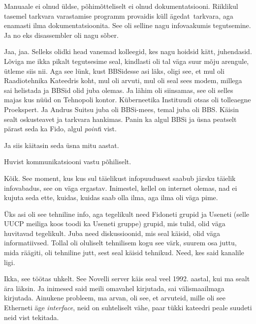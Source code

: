 Manuaale ei olnud üldse, põhimõtteliselt ei olnud dokumentatsiooni. Riiklikul 
tasemel tarkvara varastamise programm provaidis küll ägedat tarkvara, aga 
enamasti ilma dokumentatsioonita. See oli selline nagu  infovaakumis 
tegutsemine. Ja no eks disassembler oli nagu sõber.


Jaa, jaa. Selleks olidki head vanemad kolleegid, kes nagu hoidsid kätt, 
juhendasid. Lõviga me ikka pikalt tegutsesime seal, kindlasti 
oli tal väga suur mõju arengule, ütleme siis nii. Aga see lünk,  kust BBSidesse 
asi läks,  oligi see, et mul oli Raadiotehnika Kateedris koht, mul oli 
arvuti, mul oli seal sees modem, millega sai helistada ja BBSid olid juba 
olemas. Ja lähim oli siinsamas, see oli selles majas kus nüüd on 
Tehnopoli kontor. Küberneetika Instituudi otsas oli tolleaegne 
Proekspert. Ja Andrus Suitsu juba 
oli BBSi-mees, temal juba oli BBS. Käisin sealt oskusteavet ja tarkvara 
hankimas. Panin ka algul BBSi ja üsna peatselt pärast seda ka Fido, algul 
\emph{point}i vist.

Ja siis käitasin seda üsna mitu aastat. 


Huvist kommunikatsiooni vastu põhiliselt.


Kõik. See moment, kus kus sul täielikust infopuudusest saabub järsku täielik 
infovabadus, see on väga ergastav. Inimestel, kellel on internet olemas, nad ei 
kujuta seda ette, kuidas, kuidas saab olla ilma, aga ilma oli väga pime.

Üks asi oli see tehniline info, aga tegelikult need Fidoneti grupid ja Useneti 
(selle UUCP meiliga koos toodi ka Useneti gruppe) grupid, mis tulid, olid väga 
huvitavad tegelikult. Juba need diskussioonid, mis seal käisid, olid väga 
informatiivsed. Tollal oli oluliselt tehnilisem kogu see värk, suurem osa 
juttu, mida räägiti, oli tehniline jutt, sest seal käisid tehnikud. Need, kes 
said kanalile ligi.


Ikka, see töötas uhkelt. See Novelli server käis seal veel 1992. aastal, kui ma 
sealt ära läksin. Ja inimesed said meili omavahel kirjutada, sai välismaailmaga 
kirjutada. Ainukene probleem, ma arvan, oli see, et arvuteid, mille oli see 
Etherneti äge \emph{interface}, neid on suhteliselt vähe, paar tükki kateedri 
peale suudeti neid vist tekitada.

